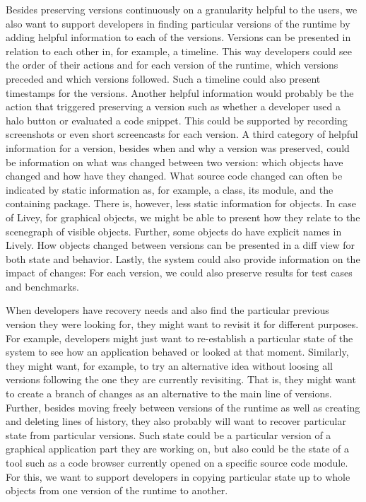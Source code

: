 Besides preserving versions continuously on a granularity helpful to the users, we also want to support developers in finding particular versions of the runtime by adding helpful information to each of the versions.
Versions can be presented in relation to each other in, for example, a timeline.
This way developers could see the order of their actions and for each version of the runtime, which versions preceded and which versions followed.
Such a timeline could also present timestamps for the versions.
Another helpful information would probably be the action that triggered preserving a version such as whether a developer used a halo button or evaluated a code snippet.
This could be supported by recording screenshots or even short screencasts for each version.
A third category of helpful information for a version, besides when and why a version was preserved, could be information on what was changed between two version: which objects have changed and how have they changed.
What source code changed can often be indicated by static information as, for example, a class, its module, and the containing package.
There is, however, less static information for objects.
In case of Livey, for graphical objects, we might be able to present how they relate to the scenegraph of visible objects.
Further, some objects do have explicit names in Lively.
How objects changed between versions can be presented in a diff view for both state and behavior.
Lastly, the system could also provide information on the impact of changes: For each version, we could also preserve results for test cases and benchmarks.

When developers have recovery needs and also find the particular previous version they were looking for, they might want to revisit it for different purposes.
For example, developers might just want to re-establish a particular state of the system to see how an application behaved or looked at that moment.
Similarly, they might want, for example, to try an alternative idea without loosing all versions following the one they are currently revisiting.
That is, they might want to create a branch of changes as an alternative to the main line of versions.
Further, besides moving freely between versions of the runtime as well as creating and deleting lines of history, they also probably will want to recover particular state from particular versions.
Such state could be a particular version of a graphical application part they are working on, but also could be the state of a tool such as a code browser currently opened on a specific source code module.
For this, we want to support developers in copying particular state up to whole objects from one version of the runtime to another.

